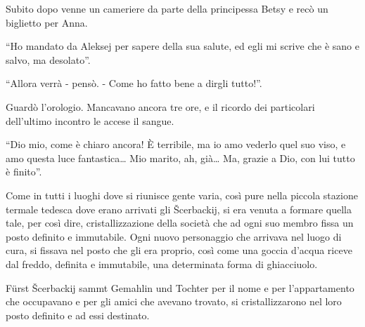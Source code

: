Subito dopo venne un cameriere da parte della principessa Betsy e recò un biglietto per Anna. 

``Ho mandato da Aleksej per sapere della sua salute, ed egli mi scrive che è sano e salvo, ma desolato''. 

``Allora verrà - pensò. - Come ho fatto bene a dirgli tutto!''. 

Guardò l'orologio. Mancavano ancora tre ore, e il ricordo dei particolari dell'ultimo incontro le accese il sangue. 

``Dio mio, come è chiaro ancora! È terribile, ma io amo vederlo quel suo viso, e amo questa luce fantastica\ldots{} Mio marito, ah, già\ldots{} Ma, grazie a Dio, con lui tutto è finito''. 

\label{xxx-1} 

Come in tutti i luoghi dove si riunisce gente varia, così pure nella piccola stazione termale tedesca dove erano arrivati gli Šcerbackij, si era venuta a formare quella tale, per così dire, cristallizzazione della società che ad ogni suo membro fissa un posto definito e immutabile. Ogni nuovo personaggio che arrivava nel luogo di cura, si fissava nel posto che gli era proprio, così come una goccia d'acqua riceve dal freddo, definita e immutabile, una determinata forma di ghiacciuolo. 

Fürst Šcerbackij sammt Gemahlin und Tochter per il nome e per l'appartamento che occupavano e per gli amici che avevano trovato, si cristallizzarono nel loro posto definito e ad essi destinato. 

